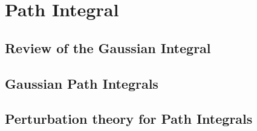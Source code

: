 \chapter{Path Integral}

\section{Review of the Gaussian Integral}

\section{Gaussian Path Integrals}

\section{Perturbation theory for Path Integrals}
